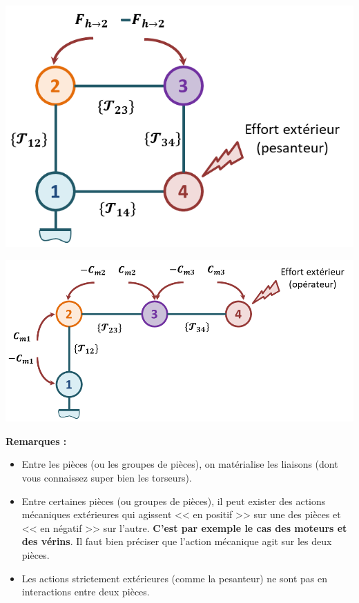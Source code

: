 \begin{minipage}[c]{.4\linewidth}
\begin{center}
\includegraphics[width=\linewidth]{images/fig_01}
\end{center}
\end{minipage}
\hfill
\begin{minipage}[c]{.55\linewidth}
\begin{center}
\includegraphics[width=\linewidth]{images/fig_02}
\end{center}
\end{minipage}

\textbf{Remarques :}
\begin{itemize}
\item Entre les pièces (ou les groupes de pièces), on matérialise les liaisons (dont vous connaissez super bien les torseurs).
\item Entre certaines pièces (ou groupes de pièces), il peut exister des actions mécaniques extérieures qui agissent << en positif >> sur une des pièces et << en négatif >> sur l'autre. \textbf{C'est par exemple le cas des moteurs et des vérins}. Il faut bien préciser que l'action mécanique agit sur les deux pièces.
\item Les actions strictement extérieures (comme la pesanteur) ne sont pas en interactions entre deux pièces.
\end{itemize}


